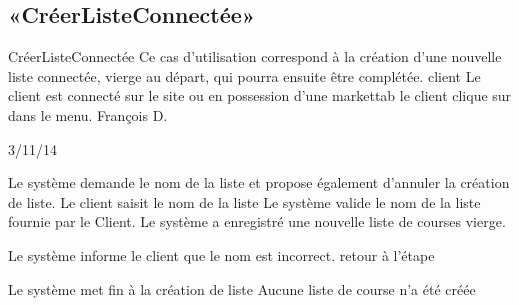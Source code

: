 \subsection[SS:CLC]{«CréerListeConnectée»}

\startCU
\nom CréerListeConnectée
\but Ce cas d’utilisation correspond à la création d’une nouvelle liste connectée, vierge au départ, qui pourra ensuite être complétée.
\acteur client
\precondition Le client est connecté sur le site ou en possession d'une markettab
\declenchement le client clique sur  dans le menu.
\auteur François D.
\date 03/11/14

\nominal %
\startnominal
{} Le système demande le nom de la liste et propose également d'annuler la création de liste.
 Le client saisit le nom de la liste
 Le système valide le nom de la liste fournie par le Client.
\stopnominal
\postcondition Le système a enregistré une nouvelle liste de courses vierge.

\alternatifs %
  \etape Le système informe le client que le nom est incorrect.
  \etape retour à l'étape 
\stopcondition
\stopalternatif

\exception %
  \etape Le système met fin à la création de liste
\stopcondition
\postcondition Aucune liste de course n'a été créée
\stopalternatif
\stopCU
